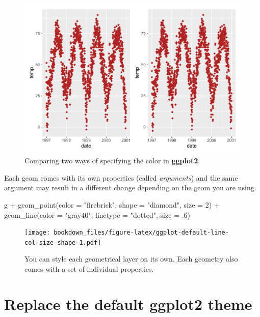 \documentclass[
]{krantz}
\makeatletter
\newenvironment{Shaded}{\begin{snugshade}}{\end{snugshade}}
\newcommand{\AttributeTok}[1]{\textcolor[rgb]{0.61,0.61,0.61}{#1}}
\newcommand{\DecValTok}[1]{\textcolor[rgb]{0.06,0.06,0.06}{#1}}
\newcommand{\FunctionTok}[1]{\textcolor[rgb]{0,0,0}{#1}}
\newcommand{\NormalTok}[1]{#1}
\newcommand{\SpecialCharTok}[1]{\textcolor[rgb]{0,0,0}{#1}}
\newcommand{\StringTok}[1]{\textcolor[rgb]{0.5,0.5,0.5}{#1}}
\newenvironment{kframe}{%
\medskip{}
\setlength{\fboxsep}{.8em}
 \def\at@end@of@kframe{}%
 \ifinner\ifhmode%
  \def\at@end@of@kframe{\end{minipage}}%
  \begin{minipage}{\columnwidth}%
 \fi\fi%
 \def\FrameCommand##1{\hskip\@totalleftmargin \hskip-\fboxsep
 \colorbox{shadecolor}{##1}\hskip-\fboxsep
     \hskip-\linewidth \hskip-\@totalleftmargin \hskip\columnwidth}%
 \MakeFramed {\advance\hsize-\width
   \@totalleftmargin\z@ \linewidth\hsize
   \@setminipage}}%
 {\par\unskip\endMakeFramed%
 \at@end@of@kframe}
\renewenvironment{Shaded}{\begin{kframe}}{\end{kframe}}
\makeatother
\begin{document}
\begin{figure}
\centering
\includegraphics{bookdown_files/figure-latex/ggplot-default-col-size-hex-rgb-plot-1.pdf}
\caption{\label{fig:ggplot-default-col-size-hex-rgb-plot}Comparing two ways of specifying the color in \textbf{ggplot2}.}
\end{figure}

Each geom comes with its own properties (called \emph{arguments}) and the same argument may result in a different change depending on the geom you are using.

\begin{Shaded}
\begin{Highlighting}[]
\NormalTok{g }\SpecialCharTok{+} \FunctionTok{geom\_point}\NormalTok{(}\AttributeTok{color =} \StringTok{"firebrick"}\NormalTok{, }\AttributeTok{shape =} \StringTok{"diamond"}\NormalTok{, }\AttributeTok{size =} \DecValTok{2}\NormalTok{) }\SpecialCharTok{+}
    \FunctionTok{geom\_line}\NormalTok{(}\AttributeTok{color =} \StringTok{"gray40"}\NormalTok{, }\AttributeTok{linetype =} \StringTok{"dotted"}\NormalTok{, }\AttributeTok{size =}\NormalTok{ .}\DecValTok{6}\NormalTok{)}
\end{Highlighting}
\end{Shaded}

\begin{figure}
\centering
\texttt{[image: bookdown\_files/figure-latex/ggplot-default-line-col-size-shape-1.pdf]}
\caption{\label{fig:ggplot-default-line-col-size-shape}You can style each geometrical layer on its own. Each geometry also comes with a set of individual properties.}
\end{figure}

\hypertarget{theme}{%
\section{\texorpdfstring{Replace the default \textbf{ggplot2} theme}{Replace the default ggplot2 theme}}\label{theme}}
\end{document}
